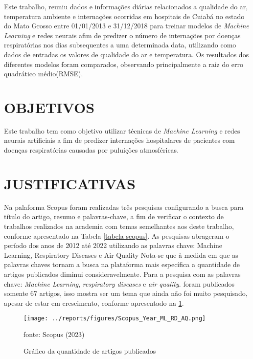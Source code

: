 \documentclass[
  12pt,		%
  a4paper,	%
  openright,%
  oneside,	%
  chapter=TITLE,		%
  section=TITLE,		%
  english,	%
  french,	%
  spanish,	%
  brazil	%
]{abntex2}
\begin{document}
    Este trabalho, reuniu dados e informações diárias relacionados a qualidade do ar, temperatura ambiente e internações ocorridas em hospitais
    de Cuiabá no estado do Mato Grosso entre 01/01/2013 e 31/12/2018 para treinar modelos de \textit{Machine Learning} e redes neurais afim de predizer
    o número de internações por doenças respiratórias nos dias subsequentes a uma determinada data, utilizando como dados de entradas os valores de qualidade do ar
    e temperatura. Os resultados dos diferentes modelos foram comparados, observando principalmente a raiz do erro quadrático médio(RMSE).
    
    \section{OBJETIVOS}
    Este trabalho tem como objetivo utilizar técnicas de \textit{Machine Learning} e redes neurais artificiais a fim de predizer 
    internações hospitalares de pacientes com doenças respiratórias
    causadas por puluições atmosféricas.
    \section{JUSTIFICATIVAS}
    Na palaforma Scopus foram realizadas três pesquisas configurando a busca para título do artigo, resumo e palavras-chave, a fim de verificar o contexto de trabalhos
    realizados na academia com temas semelhantes aos deste trabalho, conforme apresentado na Tabela \ref*{tabela scopus}. As pesquisas abrageram o período dos anos
    de 2012 até 2022 utilizando as palavras chave: Machine Learning, Respiratory Diseases e Air Quality
    Nota-se que à medida em que as palavras chaves tornam a busca na plataforma mais específica a quantidade de artigos publicados diminui consideravelmente.
    Para a pesquisa com as palavras chave: \textit{Machine Learning}, \textit{respiratory diseases} e \textit{air quality}.
    foram publicados somente 67 artigos, isso mostra ser um tema que ainda não foi muito pesquisado, apesar de estar em crescimento,
    conforme apresentado na \ref*{scopus_year}.

    \begin{figure}[ht]
        \centering
        \caption{Gráfico da quantidade de artigos publicados}
        \texttt{[image: ../reports/figures/Scopus\_Year\_ML\_RD\_AQ.png]}
        \label{scopus_year}
        \par
        {\small fonte: Scopus (2023)}
    \end{figure}
\end{document}

